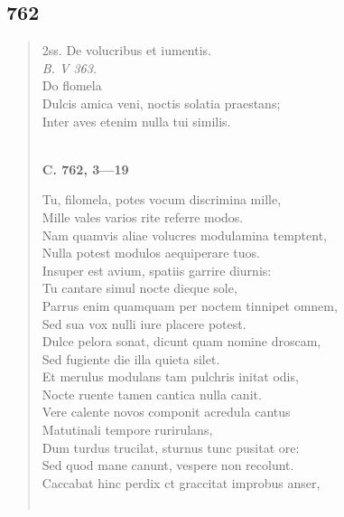 \documentclass[11pt, a4paper]{report}
\begin{document}
            \subsection*{762}
      \begin{verse}
       \lbrack  2ss. De volucribus et iumentis. \\ \textit{B. V 363.} \\ Do flomela \\ Dulcis amica veni, noctis solatia praestans; \\ Inter aves etenim nulla tui similis. \\ 
        ﻿\pagebreak 
    \begin{center} \textbf{C. 762, 3—19} \end{center} \marginpar{[4]} Tu, filomela, potes vocum discrimina mille, \\ Mille vales varios rite referre modos. \\ Nam quamvis aliae volucres modulamina temptent, \\ Nulla potest modulos aequiperare tuos. \\ Insuper est avium, spatiis garrire diurnis: \\ Tu cantare simul nocte dieque sole, \\ Parrus enim quamquam per noctem tinnipet omnem, \\ Sed sua vox nulli iure placere potest. \\ Dulce pelora sonat, dicunt quam nomine droscam, \\ Sed fugiente die illa quieta silet. \\ Et merulus modulans tam pulchris initat odis, \\ Nocte ruente tamen cantica nulla canit. \\ Vere calente novos componit acredula cantus \\ Matutinali tempore rurirulans, \\ Dum turdus trucilat, sturnus tunc pusitat ore: \\ Sed quod mane canunt, vespere non recolunt. \\ Caccabat hinc perdix ct graccitat improbus anser, \\ 
        ﻿\pagebreak 

\end{verse}
\end{document}
